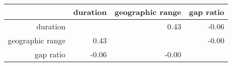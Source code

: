 \begin{table}[ht]
\centering
\begin{tabular}{rrrr}
  \hline
 & duration & geographic range & gap ratio \\ 
  \hline
duration &  & 0.43 & -0.06 \\ 
  geographic range & 0.43 &  & -0.00 \\ 
  gap ratio & -0.06 & -0.00 &  \\ 
   \hline
\end{tabular}
\label{tab:corr}
\end{table}
